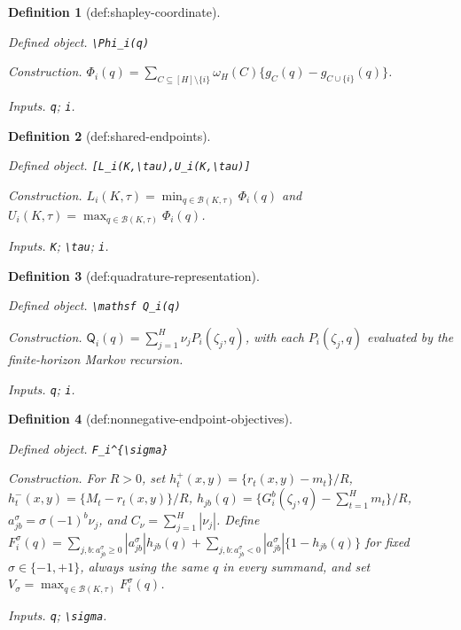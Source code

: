 \documentclass{article}
\newtheorem{definition}{Definition}
\begin{document}
\begin{definition}[def:shapley-coordinate]\label{def:shapley-coordinate}
\par\smallskip\noindent\emph{Defined object.} \texttt{\textbackslash{}\allowbreak{}Phi\_\allowbreak{}i(q)}
\par\smallskip\noindent\emph{Construction.} \(\Phi_i(q)=\sum_{C\subseteq[H]\setminus\{i\}}\omega_H(C)\{g_C(q)-g_{C\cup\{i\}}(q)\}\).
\par\smallskip\noindent\emph{Inputs.} \texttt{q}; \texttt{i}.
\end{definition}

\begin{definition}[def:shared-endpoints]\label{def:shared-endpoints}
\par\smallskip\noindent\emph{Defined object.} \texttt{[L\_\allowbreak{}i(K,\allowbreak{}\textbackslash{}\allowbreak{}tau),\allowbreak{}U\_\allowbreak{}i(K,\allowbreak{}\textbackslash{}\allowbreak{}tau)]}
\par\smallskip\noindent\emph{Construction.} \(L_i(K,\tau)=\min_{q\in\mathcal B(K,\tau)}\Phi_i(q)\) and \(U_i(K,\tau)=\max_{q\in\mathcal B(K,\tau)}\Phi_i(q)\).
\par\smallskip\noindent\emph{Inputs.} \texttt{K}; \texttt{\textbackslash{}\allowbreak{}tau}; \texttt{i}.
\end{definition}

\begin{definition}[def:quadrature-representation]\label{def:quadrature-representation}
\par\smallskip\noindent\emph{Defined object.} \texttt{\textbackslash{}\allowbreak{}mathsf Q\_\allowbreak{}i(q)}
\par\smallskip\noindent\emph{Construction.} \(\mathsf Q_i(q)=\sum_{j=1}^H\nu_jP_i(\zeta_j,q)\), with each \(P_i(\zeta_j,q)\) evaluated by the finite-horizon Markov recursion.
\par\smallskip\noindent\emph{Inputs.} \texttt{q}; \texttt{i}.
\end{definition}

\begin{definition}[def:nonnegative-endpoint-objectives]\label{def:nonnegative-endpoint-objectives}
\par\smallskip\noindent\emph{Defined object.} \texttt{F\_\allowbreak{}i\textasciicircum{}\{\textbackslash{}\allowbreak{}sigma\}\allowbreak{}}
\par\smallskip\noindent\emph{Construction.} For \(R>0\), set \(h_t^{+}(x,y)=\{r_t(x,y)-m_t\}/R\), \(h_t^{-}(x,y)=\{M_t-r_t(x,y)\}/R\), \(h_{jb}(q)=\{G_i^b(\zeta_j,q)-\sum_{t=1}^Hm_t\}/R\), \(a_{jb}^{\sigma}=\sigma(-1)^b\nu_j\), and \(C_{\nu}=\sum_{j=1}^H|\nu_j|\). Define \(F_i^{\sigma}(q)=\sum_{j,b:a_{jb}^{\sigma}\ge0}|a_{jb}^{\sigma}|h_{jb}(q)+\sum_{j,b:a_{jb}^{\sigma}<0}|a_{jb}^{\sigma}|\{1-h_{jb}(q)\}\) for fixed \(\sigma\in\{-1,+1\}\), always using the same \(q\) in every summand, and set \(V_{\sigma}=\max_{q\in\mathcal B(K,\tau)}F_i^{\sigma}(q)\).
\par\smallskip\noindent\emph{Inputs.} \texttt{q}; \texttt{\textbackslash{}\allowbreak{}sigma}.
\end{definition}
\end{document}
